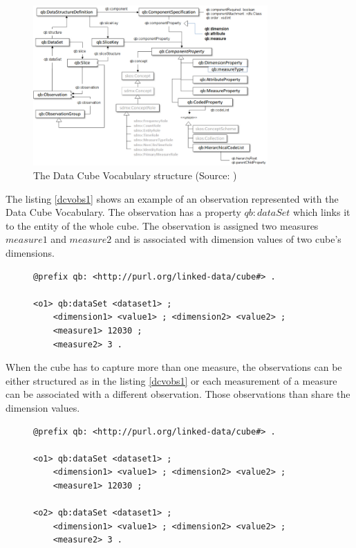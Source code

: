 \begin{figure}[h]
\centering
\includegraphics[width=0.8\textwidth]{img/qbstructure.png}
\caption{The Data Cube Vocabulary structure (Source: \cite{dcv2014})}
\label{qbstructureimg}
\end{figure}

The listing \ref{dcvobs1} shows an example of an observation represented with the Data Cube Vocabulary. The observation has a property $qb:dataSet$ which links it to the entity of the whole cube. The observation is assigned two measures $measure1$ and $measure2$ and is associated with dimension values of two cube's dimensions.

\begin{figure}[h]
\begin{lstlisting}[language = turtle, caption={Data Cube Vocabulary observations example 1}, label={dcvobs1},captionpos=b escapeinside={(*@}{@*)}]
@prefix qb: <http://purl.org/linked-data/cube#> .
    
<o1> qb:dataSet <dataset1> ;
    <dimension1> <value1> ; <dimension2> <value2> ;
    <measure1> 12030 ;
    <measure2> 3 .
\end{lstlisting}
\end{figure}

When the cube has to capture more than one measure, the observations can be either structured as in the listing \ref{dcvobs1} or each measurement of a measure can be associated with a different observation. Those observations than share the dimension values.

\begin{figure}[h]
\begin{lstlisting}[language = turtle, caption={Data Cube Vocabulary observations example 2}, label={dcvobs2},captionpos=b escapeinside={(*@}{@*)}]
@prefix qb: <http://purl.org/linked-data/cube#> .
    
<o1> qb:dataSet <dataset1> ;
    <dimension1> <value1> ; <dimension2> <value2> ;
    <measure1> 12030 ;
        
<o2> qb:dataSet <dataset1> ;
    <dimension1> <value1> ; <dimension2> <value2> ;
    <measure2> 3 .
\end{lstlisting}
\end{figure}


